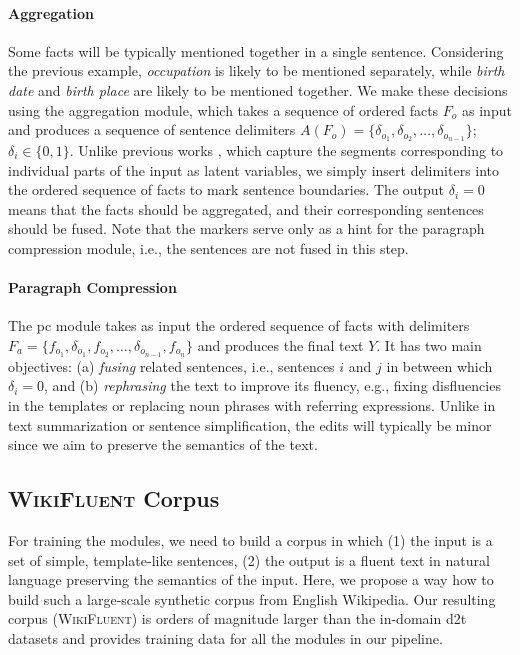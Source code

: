 \paragraph{Aggregation} Some facts will be typically mentioned together in a single sentence. Considering the previous example, \textit{occupation} is likely to be mentioned separately, while \textit{birth date} and \textit{birth place} are likely to be mentioned together. We make these decisions using the aggregation module, which takes a sequence of ordered facts $F_o$ as input and produces a sequence of sentence delimiters $A(F_o) = \{\delta_{o_1}, \delta_{o_2}, \ldots, \delta_{o_{n-1}}\}$; $\delta_{i} \in \{0, 1\}$.
Unlike previous works \cite{wiseman2018learning,shao-etal-2019-long,shen-etal-2020-neural,xuAGGGENOrderingAggregating2021}, which capture the segments corresponding to individual parts of the input as latent variables, we simply insert delimiters into the ordered sequence of facts to mark sentence boundaries. The output $\delta_{i}=0$ means that the facts should be aggregated, and their corresponding sentences should be fused. Note that the markers serve only as a hint for the paragraph compression module, i.e., the sentences are not fused in this step.



\paragraph{Paragraph Compression}  The \ac{pc} module takes as input the ordered sequence of facts with delimiters $F_a = \{f_{o_1}, \delta_{o_1}, f_{o_2}, \ldots, \delta_{o_{n-1}}, f_{o_n}\}$ and produces the final text $Y$.  It has two main objectives: (a) \textit{fusing} related sentences, i.e., sentences $i$ and $j$ in between which $\delta_{i}=0$, and (b) \textit{rephrasing} the text to improve its fluency, e.g., fixing disfluencies in the templates or replacing noun phrases with referring expressions. Unlike in text summarization or sentence simplification, the edits will typically be minor since we aim to preserve the semantics of the text.



\subsection{\textsc{WikiFluent} Corpus}
\label{sec:pipeline:wikifluent}
For training the modules, we need to build a corpus in which (1) the input is a set of simple, template-like sentences, (2) the output is a fluent text in natural language preserving the semantics of the input. Here, we propose a way how to build such a large-scale synthetic corpus from English Wikipedia. Our resulting corpus (\textsc{WikiFluent}) is orders of magnitude larger than the in-domain \ac{d2t} datasets and provides training data for all the modules in our pipeline.

